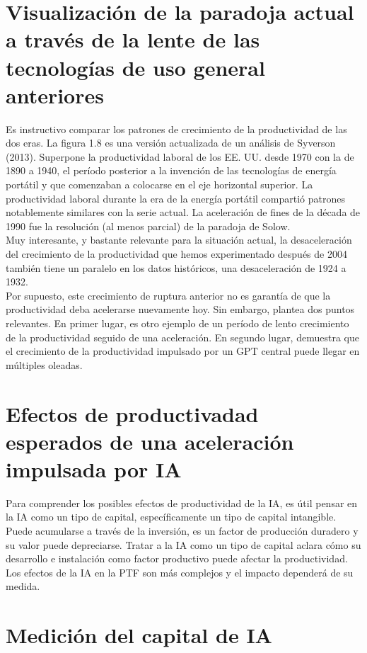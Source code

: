 \section{Visualización de la paradoja actual a través de la lente de las tecnologías de uso general anteriores}
Es instructivo comparar los patrones de crecimiento de la productividad de las dos eras. La figura 1.8 es una versión actualizada de un análisis de Syverson (2013). Superpone la productividad laboral de los EE. UU. desde 1970 con la de 1890 a 1940, el período posterior a la invención de las tecnologías de energía portátil y que comenzaban a colocarse en el eje horizontal superior. La productividad laboral durante la era de la energía portátil compartió patrones notablemente similares con la serie actual. La aceleración de fines de la década de 1990 fue la resolución (al menos parcial) de la paradoja de Solow.\\
Muy interesante, y bastante relevante para la situación actual, la desaceleración del crecimiento de la productividad que hemos experimentado después de 2004 también tiene un paralelo en los datos históricos, una desaceleración de 1924 a 1932.\\
Por supuesto, este crecimiento de ruptura anterior no es garantía de que la productividad deba acelerarse nuevamente hoy. Sin embargo, plantea dos puntos relevantes. En primer lugar, es otro ejemplo de un período de lento crecimiento de la productividad seguido de una aceleración. En segundo lugar, demuestra que el crecimiento de la productividad impulsado por un GPT central puede llegar en múltiples oleadas.

\section{Efectos de productivadad esperados de una aceleración impulsada por IA}
Para comprender los posibles efectos de productividad de la IA, es útil pensar en la IA como un tipo de capital, específicamente un tipo de capital intangible. Puede acumularse a través de la inversión, es un factor de producción duradero y su valor puede depreciarse. Tratar a la IA como un tipo de capital aclara cómo su desarrollo e instalación como factor productivo puede afectar la productividad.\\
Los efectos de la IA en la PTF son más complejos y el impacto  dependerá de su medida.

\section{Medición del capital de IA}



